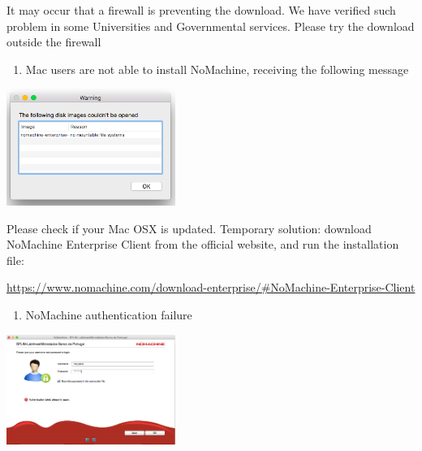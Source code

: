 \documentclass[]{book}
\providecommand{\tightlist}{%
  \setlength{\itemsep}{0pt}\setlength{\parskip}{0pt}}
\begin{document}
It may occur that a firewall is preventing the download. We have
verified such problem in some Universities and Governmental services.
Please try the download outside the firewall

\begin{enumerate}
\def\labelenumi{\arabic{enumi}.}
\setcounter{enumi}{1}
\tightlist
\item
  Mac users are not able to install NoMachine, receiving the following
  message
\end{enumerate}

\includegraphics[width=2.16535in,height=1.49697in]{./media/image45.png}

Please check if your Mac OSX is updated. Temporary solution: download
NoMachine Enterprise Client from the official website, and run the
installation file:

\url{https://www.nomachine.com/download-enterprise/\#NoMachine-Enterprise-Client}

\begin{enumerate}
\def\labelenumi{\arabic{enumi}.}
\setcounter{enumi}{2}
\tightlist
\item
  NoMachine authentication failure
\end{enumerate}

\includegraphics[width=2.16535in,height=1.40773in]{./media/image46.png}
\end{document}
